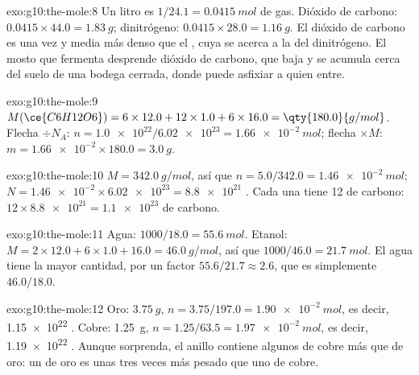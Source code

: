 \begin{solution}{exo:g10:the-mole:8}
Un litro es $1/24.1 = \qty{0.0415}{mol}$ de gas. Dióxido de carbono:
$0.0415 \times 44.0 = \qty{1.83}{g}$; dinitrógeno:
$0.0415 \times 28.0 = \qty{1.16}{g}$. El dióxido de carbono es una vez y
media más denso que el , cuya  se acerca a la del
dinitrógeno. El mosto que fermenta desprende dióxido de carbono, que
baja y se acumula cerca del suelo de una bodega cerrada, donde puede
asfixiar a quien entre.
\end{solution}

\begin{solution}{exo:g10:the-mole:9}
$M(\ce{C6H12O6}) = 6 \times 12.0 + 12 \times 1.0 + 6 \times 16.0 =
\qty{180.0}{g/mol}$. Flecha $\div N_A$: $n = \num{1.0e22} / \num{6.02e23} =
\qty{1.66e-2}{mol}$; flecha $\times M$: $m = \num{1.66e-2} \times 180.0 =
\qty{3.0}{g}$.
\end{solution}

\begin{solution}{exo:g10:the-mole:10}
$M = \qty{342.0}{g/mol}$, así que $n = 5.0 / 342.0 = \qty{1.46e-2}{mol}$;
$N = \num{1.46e-2} \times \num{6.02e23} = \num{8.8e21}$ . Cada
una tiene 12  de carbono: $12 \times \num{8.8e21} = \num{1.1e23}$
 de carbono.
\end{solution}

\begin{solution}{exo:g10:the-mole:11}
Agua: $1000 / 18.0 = \qty{55.6}{mol}$. Etanol:
$M = 2 \times 12.0 + 6 \times 1.0 + 16.0 = \qty{46.0}{g/mol}$, así que
$1000 / 46.0 = \qty{21.7}{mol}$. El agua tiene la mayor cantidad, por un
factor $55.6 / 21.7 \approx 2.6$, que es simplemente $46.0 / 18.0$.
\end{solution}

\begin{solution}{exo:g10:the-mole:12}
Oro: $\qty{3.75}{g}$, $n = 3.75 / 197.0 = \qty{1.90e-2}{mol}$, es decir,
\num{1.15e22} . Cobre: \qty{1.25}{g},
$n = 1.25 / 63.5 = \qty{1.97e-2}{mol}$, es decir, \num{1.19e22} .
Aunque sorprenda, el anillo contiene algunos  de cobre más que de
oro: un  de oro es unas tres veces más pesado que uno de cobre.
\end{solution}

